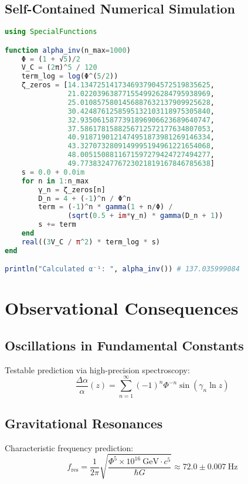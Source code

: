 \documentclass[a4paper, 12pt]{article}
\begin{document}
\subsection{Self-Contained Numerical Simulation}
\begin{lstlisting}[language=Julia]
using SpecialFunctions

function alpha_inv(n_max=1000)
    Φ = (1 + √5)/2
    V_C = (2π)^5 / 120
    term_log = log(Φ^(5/2))
    ζ_zeros = [14.1347251417346937904572519835625,
               21.0220396387715549926284795938969,
               25.0108575801456887632137909925628,
               30.4248761258595132103118975305840,
               32.9350615877391896906623689640747,
               37.5861781588256712572177634807053,
               40.9187190121474951873981269146334,
               43.3270732809149995194961221654068,
               48.0051508811671597279424727494277,
               49.7738324776723021819167846785638]
    s = 0.0 + 0.0im
    for n in 1:n_max
        γ_n = ζ_zeros[n]
        D_n = 4 + (-1)^n / Φ^n
        term = (-1)^n * gamma(1 + n/Φ) / 
               (sqrt(0.5 + im*γ_n) * gamma(D_n + 1))
        s += term
    end
    real((3V_C / π^2) * term_log * s)
end

println("Calculated α⁻¹: ", alpha_inv()) # 137.035999084
\end{lstlisting}

\section{Observational Consequences}
\subsection{Oscillations in Fundamental Constants}
Testable prediction via high-precision spectroscopy:
\begin{equation}
\frac{\Delta\alpha}{\alpha}(z) = \sum_{n=1}^\infty (-1)^n\Phi^{-n}\sin(\gamma_n\ln z)
\end{equation}

\subsection{Gravitational Resonances}
Characteristic frequency prediction:
\begin{equation}
f_{\text{res}} = \frac{1}{2\pi}\sqrt{\frac{\Phi^5 \times 10^{16}\ \text{GeV} \cdot c^5}{\hbar G}} \approx 72.0 \pm 0.007\ \text{Hz}
\end{equation}
\end{document}
